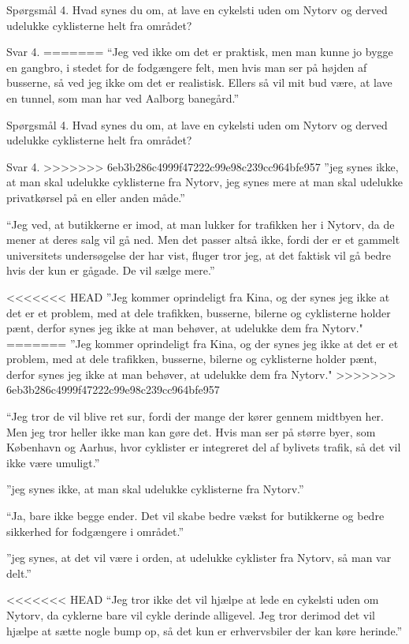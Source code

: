 \begin{appendics}
\begin{appendics}
Spørgsmål 4.
Hvad synes du om, at lave en cykelsti uden om Nytorv og derved udelukke cyklisterne helt fra området?

Svar 4.
=======
“Jeg ved ikke om det er praktisk, men man kunne jo bygge en gangbro, i stedet for de fodgængere felt, men hvis man ser på højden af busserne, så ved jeg ikke om det er realistisk. Ellers så vil mit bud være, at lave en tunnel, som man har ved Aalborg banegård.” 

Spørgsmål 4. 
Hvad synes du om, at lave en cykelsti uden om Nytorv og derved udelukke cyklisterne helt fra området?

Svar 4. 
>>>>>>> 6eb3b286c4999f47222c99e98c239cc964bfe957
”jeg synes ikke, at man skal udelukke cyklisterne fra Nytorv, jeg synes mere at man skal udelukke privatkørsel på en eller anden måde.”

“Jeg ved, at butikkerne er imod, at man lukker for trafikken her i Nytorv, da de mener at deres salg vil gå ned. Men det passer altså ikke, fordi der er et gammelt universitets undersøgelse der har vist, fluger tror jeg, at det faktisk vil gå bedre hvis der kun er gågade. De vil sælge mere.”

<<<<<<< HEAD
”Jeg kommer oprindeligt fra Kina, og der synes jeg ikke at det er et problem, med at dele trafikken, busserne, bilerne og cyklisterne holder pænt, derfor synes jeg ikke at man behøver, at udelukke dem fra Nytorv."
=======
”Jeg kommer oprindeligt fra Kina, og der synes jeg ikke at det er et problem, med at dele trafikken, busserne, bilerne og cyklisterne holder pænt, derfor synes jeg ikke at man behøver, at udelukke dem fra Nytorv." 
>>>>>>> 6eb3b286c4999f47222c99e98c239cc964bfe957

“Jeg tror de vil blive ret sur, fordi der mange der kører gennem midtbyen her. Men jeg tror heller ikke man kan gøre det. Hvis man ser på større byer, som København og Aarhus, hvor cyklister er integreret del af bylivets trafik, så det vil ikke være umuligt.”

”jeg synes ikke, at man skal udelukke cyklisterne fra Nytorv.”

“Ja, bare ikke begge ender. Det vil skabe bedre vækst for butikkerne og bedre sikkerhed for fodgængere i området.”

”jeg synes, at det vil være i orden, at udelukke cyklister fra Nytorv, så man var delt.”

<<<<<<< HEAD
“Jeg tror ikke det vil hjælpe at lede en cykelsti uden om Nytorv, da cyklerne bare vil cykle derinde alligevel. Jeg tror derimod det vil hjælpe at sætte nogle bump op, så det kun er erhvervsbiler der kan køre herinde.”


\end{appendics}
\end{appendics}
